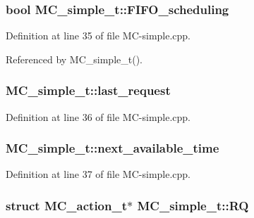 \subsubsection[{FIFO\_\-scheduling}]{\setlength{\rightskip}{0pt plus 5cm}bool {\bf MC\_\-simple\_\-t::FIFO\_\-scheduling}\hspace{0.3cm}{\tt  [protected]}}\label{classMC__simple__t_36186877640ff2b856cdbcfd71d4618c}




Definition at line 35 of file MC-simple.cpp.

Referenced by MC\_\-simple\_\-t().
\subsubsection[{last\_\-request}]{ {\bf MC\_\-simple\_\-t::last\_\-request}\hspace{0.3cm}{\tt  [protected]}}\label{classMC__simple__t_1a1198a64749adc0d7fd81d7bf14ff0e}




Definition at line 36 of file MC-simple.cpp.
\subsubsection[{next\_\-available\_\-time}]{ {\bf MC\_\-simple\_\-t::next\_\-available\_\-time}\hspace{0.3cm}{\tt  [protected]}}\label{classMC__simple__t_139dcc32a572b94a06afb2bdaa028221}




Definition at line 37 of file MC-simple.cpp.
\subsubsection[{RQ}]{\setlength{\rightskip}{0pt plus 5cm}struct {\bf MC\_\-action\_\-t}$\ast$ {\bf MC\_\-simple\_\-t::RQ}\hspace{0.3cm}{\tt  [read, protected]}}\label{classMC__simple__t_44abe4eba37952020c98daa57646e996}




